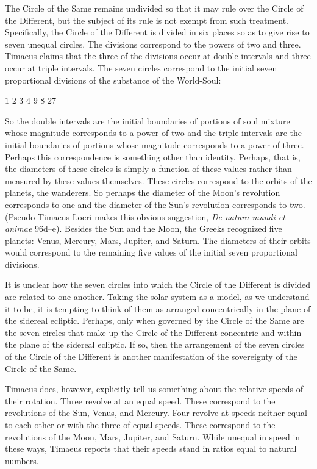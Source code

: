 The Circle of the Same remains undivided so that it may rule over the Circle of the Different, but the subject of its rule is not exempt from such treatment. Specifically, the Circle of the Different is divided in six places so as to give rise to seven unequal circles. The divisions correspond to the powers of two and three. Timaeus claims that the three of the divisions occur at double intervals and three occur at triple intervals. The seven circles correspond to the initial seven proportional divisions of the substance of the World-Soul:
\begin{center}
	\( 1 \) \( 2 \) \( 3 \) \( 4 \) \( 9 \) \( 8 \) \( 27 \)
\end{center}
So the double intervals are the initial boundaries of portions of soul mixture whose magnitude corresponds to a power of two and the triple intervals are the initial boundaries of portions whose magnitude corresponds to a power of three. Perhaps this correspondence is something other than identity. Perhaps, that is, the diameters of these circles is simply a function of these values rather than measured by these values themselves. These circles correspond to the orbits of the planets, the wanderers. So perhaps the diameter of the Moon's revolution corresponds to one and the diameter of the Sun's revolution corresponds to two. (Pseudo-Timaeus Locri makes this obvious suggestion, \emph{De natura mundi et animae} 96d--e). Besides the Sun and the Moon, the Greeks recognized five planets: Venus, Mercury, Mars, Jupiter, and Saturn. The diameters of their orbits would correspond to the remaining five values of the initial seven proportional divisions.

It is unclear how the seven circles into which the Circle of the Different is divided are related to one another. Taking the solar system as a model, as we understand it to be, it is tempting to think of them as arranged concentrically in the plane of the sidereal ecliptic. Perhaps, only when governed by the Circle of the Same are the seven circles that make up the Circle of the Different concentric and within the plane of the sidereal ecliptic. If so, then the arrangement of the seven circles of the Circle of the Different is another manifestation of the sovereignty of the Circle of the Same.

Timaeus does, however, explicitly tell us something about the relative speeds of their rotation. Three revolve at an equal speed. These correspond to the revolutions of the Sun, Venus, and Mercury. Four revolve at speeds neither equal to each other or with the three of equal speeds. These correspond to the revolutions of the Moon, Mars, Jupiter, and Saturn. While unequal in speed in these ways, Timaeus reports that their speeds stand in ratios equal to natural numbers.

